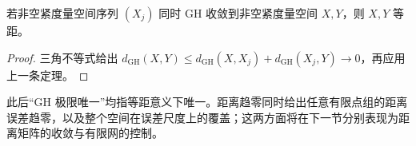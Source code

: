 \begin{corollary}\label{g3:cor:gh-limit-unique}
	若非空紧度量空间序列 \((X_j)\) 同时 GH 收敛到非空紧度量空间 \(X,Y\)，则 \(X,Y\) 等距。
\end{corollary}
\begin{proof}
	三角不等式给出
	\(d_{\mathrm{GH}}(X,Y)\le d_{\mathrm{GH}}(X,X_j)+d_{\mathrm{GH}}(X_j,Y)\to0\)，再应用上一条定理。
\end{proof}

此后“GH 极限唯一”均指等距意义下唯一。距离趋零同时给出任意有限点组的距离误差趋零，以及整个空间在误差尺度上的覆盖；这两方面将在下一节分别表现为距离矩阵的收敛与有限网的控制。
